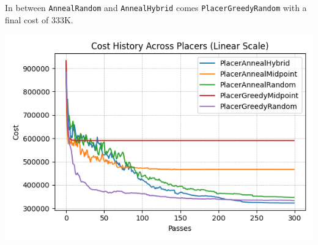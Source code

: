 In between \texttt{AnnealRandom} and \texttt{AnnealHybrid} comes \texttt{PlacerGreedyRandom} with a final cost of 333K.


{
    \centering
    \includegraphics[width=\columnwidth]{figures/results/combined_cost_history_linear.png}
    \label{fig:placers_overlay}
}


